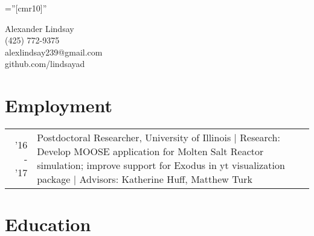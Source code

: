 \documentclass[a4paper,10pt]{article} %
\begin{document}
\pagestyle{empty} %

\font\fb=''[cmr10]'' %

\begin{center}
\Large Alexander Lindsay\\
\normalsize (425) 772-9375\\
alexlindsay239@gmail.com\\
github.com/lindsayad\\
\end{center}


\section{Employment}

\begin{table}[h]
  \begin{tabularx}{\textwidth}{rX}

    \textsc{'16 - '17} & Postdoctoral Researcher, University of Illinois |
    Research: Develop MOOSE application for Molten Salt Reactor simulation;
    improve support for Exodus in yt visualization package | Advisors: Katherine
    Huff, Matthew Turk\\

  \end{tabularx}
\end{table}


\section{Education}
\end{document}
